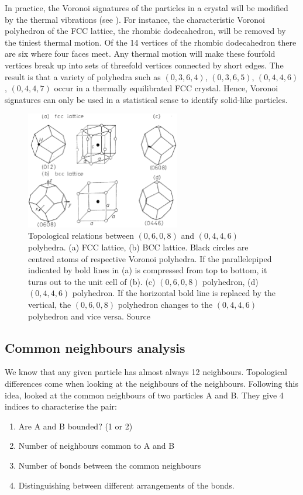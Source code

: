 In practice, the Voronoi signatures of the particles in a crystal will be modified by the thermal vibrations (see ). For instance, the characteristic Voronoi polyhedron of the \ac{FCC} lattice, the rhombic dodecahedron, will be removed by the tiniest thermal motion. Of the 14 vertices of the rhombic dodecahedron there are six where four faces meet. Any thermal motion will make these fourfold vertices break up into sets of threefold vertices connected by short edges. The result is that a variety of polyhedra such as $(0,3,6,4)$, $(0,3,6,5)$, $(0,4,4,6)$, $(0,4,4,7)$ occur in a thermally equilibrated \ac{FCC} crystal. Hence, Voronoi signatures can only be used in a statistical sense to identify solid-like particles.

\begin{figure}
	\centering
	\includegraphics[width=0.6\textwidth]{voro_cell}
	\caption{Topological relations between $(0,6,0,8)$ and $(0,4,4,6)$ polyhedra. (a) \acs{FCC} lattice, (b) \acs{BCC} lattice. Black circles are centred atoms of respective Voronoi polyhedra. If the parallelepiped indicated by bold lines in (a) is compressed from top to bottom, it turns out to the unit cell of (b). (c) $(0,6,0,8)$ polyhedron, (d) $(0,4,4,6)$ polyhedron. If the horizontal bold line is replaced by the vertical, the $(0,6,0,8)$ polyhedron changes to the $(0,4,4,6)$ polyhedron and vice versa. Source }
	\label{fig:voroCell}
\end{figure}

\subsection{Common neighbours analysis}
\label{sec:commonNgb}

We know that any given particle has almost always 12 neighbours. Topological differences come when looking at the neighbours of the neighbours. Following this idea, \citet{Honeycutt1987} looked at the common neighbours of two particles A and B. They give 4 indices to characterise the pair:
\begin{enumerate}
	\item Are A and B bounded? (1 or 2)
	\item Number of neighbours common to A and B
	\item Number of bonds between the common neighbours
	\item Distinguishing between different arrangements of the bonds.
\end{enumerate}

